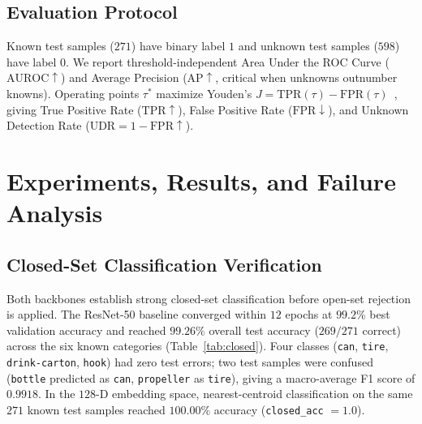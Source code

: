 \documentclass[conference]{IEEEtran}
\begin{document}
\subsection{Evaluation Protocol}
\label{sec:eval}

Known test samples ($271$) have binary label $1$ and unknown test samples ($598$) have label $0$. We report threshold-independent Area Under the ROC Curve ($\mathrm{AUROC} \uparrow$) and Average Precision ($\mathrm{AP} \uparrow$, critical when unknowns outnumber knowns). Operating points $\tau^*$ maximize Youden's $J = \mathrm{TPR}(\tau) - \mathrm{FPR}(\tau)$~\cite{youden_1950_index}, giving True Positive Rate ($\mathrm{TPR} \uparrow$), False Positive Rate ($\mathrm{FPR} \downarrow$), and Unknown Detection Rate ($\mathrm{UDR} = 1 - \mathrm{FPR} \uparrow$).

\section{Experiments, Results, and Failure Analysis}
\label{sec:results}

\subsection{Closed-Set Classification Verification}
\label{sec:closed}

Both backbones establish strong closed-set classification before open-set rejection is applied. The ResNet-50 baseline converged within $12$ epochs at $99.2\%$ best validation accuracy and reached $99.26\%$ overall test accuracy ($269 / 271$ correct) across the six known categories (Table~\ref{tab:closed}). Four classes (\texttt{can}, \texttt{tire}, \texttt{drink-carton}, \texttt{hook}) had zero test errors; two test samples were confused (\texttt{bottle} predicted as \texttt{can}, \texttt{propeller} as \texttt{tire}), giving a macro-average F1 score of $0.9918$. In the $128$-D embedding space, nearest-centroid classification on the same $271$ known test samples reached $100.00\%$ accuracy (\texttt{closed\_acc} $= 1.0$).
\end{document}
